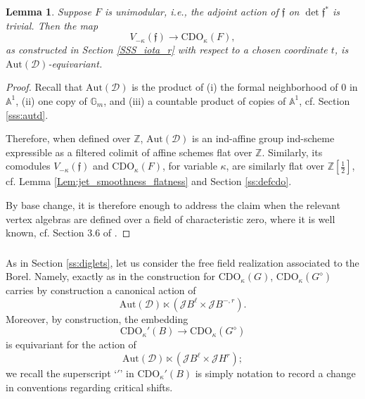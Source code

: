 \documentclass{amsart}
\newtheorem{Lem}[Thm]{Lemma}
\theoremstyle{definition}
\newcommand{\sss}{\subsubsection{}}
\newcommand{\D}{\sD}
\newcommand{\sD}{\mathscr{D}}
\newcommand{\on}{\mathrm}
\newcommand{\Jet}{\mathscr{J}}
\newcommand{\ff}{\mathfrak{f}}
\newcommand{\CDO}{\mathrm{CDO}}
\newcommand{\Aut}{\on{Aut}}
\numberwithin{equation}{section}
\begin{document}
\begin{Lem} \label{l:rightvectfields} Suppose $F$ is unimodular, i.e., the adjoint action of $\ff$ on $\det \ff^*$ is trivial. Then the map 
$$ V_{-\kappa}(\ff) \rightarrow \CDO_\kappa(F), $$
    as constructed in Section \ref{SSS_iota_r} with respect to a chosen coordinate $t$, is $\Aut(\D)$-equivariant.  
\end{Lem}

\begin{proof} Recall that $\Aut(\sD)$ is the product of (i) the formal neighborhood of $0$ in $\mathbb{A}^1$, (ii) one copy of $\mathbb{G}_m$, and (iii) a countable product of copies of $\mathbb{A}^1$, cf. Section \ref{sss:autd}. 

Therefore, when defined over $\mathbb{Z}$, $\Aut(\D)$ is an ind-affine group ind-scheme expressible as a filtered colimit of affine schemes flat over $\mathbb{Z}$. Similarly,  its comodules  $V_{-\kappa}(\ff)$ and $\CDO_\kappa(F)$, for variable $\kappa$, are similarly flat over $\mathbb{Z}[\frac{1}{2}]$, cf. Lemma \ref{Lem:jet_smoothness_flatness} and Section \ref{ss:defcdo}. 

By base change, it is therefore enough to address the claim when the relevant vertex algebras are defined over a field of characteristic zero, where it is well known, cf.  Section 3.6 of \cite{Arkhipov_Gaitsgory}.
\end{proof}




\sss As in Section \ref{ss:diglets}, let us consider the free field realization associated to the Borel. Namely, exactly as in the construction for $\CDO_\kappa(G)$, $\CDO_\kappa(G^\diamond)$ carries by construction a canonical action of $$\Aut(\sD) \ltimes (\Jet B^\ell \times \Jet B^{-, r}).$$ 
Moreover, by construction, the embedding$$\CDO_\kappa'(B) \rightarrow \CDO_\kappa(G^\diamond)$$is equivariant for the action of $$\Aut(\sD) \ltimes (\Jet B^\ell \times \Jet H^r);$$we recall the superscript `$'$' in $\CDO_\kappa'(B)$ is simply notation to record a change in conventions regarding critical shifts. 
\end{document}
